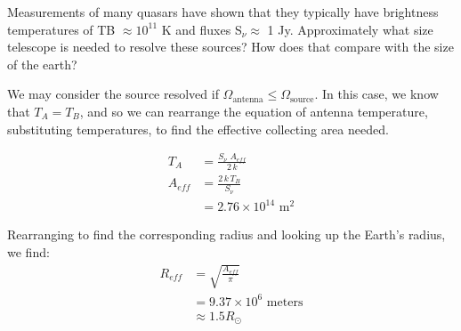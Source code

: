 \documentclass[12pt]{article}
\newenvironment{answer}[2][Answer]{\begin{trivlist}
\item[\hskip \labelsep {\bfseries #1}\hskip \labelsep {\bfseries #2.}]}{\end{trivlist}}
\newenvironment{warmup}[2][Warm Up]{\begin{trivlist}
\item[\hskip \labelsep {\bfseries #1}\hskip \labelsep {\bfseries #2.}]}{\end{trivlist}}
\begin{document}
\begin{warmup}{2}
  Measurements of many quasars have shown that they typically have brightness temperatures of TB $\approx 10^{11}$ K and fluxes S$_{\nu} \approx$ 1 Jy. Approximately what size telescope is needed to resolve these sources? How does that compare with the size of the earth?
\end{warmup}
\begin{answer}{Warm Up 2}

We may consider the source resolved if $\Omega_{\text{antenna}} \leq \Omega_{\text{source}}$. In this case, we know that $T_A = T_B$, and so we can rearrange the equation of antenna temperature, substituting temperatures, to find the effective collecting area needed.

\begin{align*}
  T_A &= \frac{S_{\nu} \,\, A_{eff}}{2 \, k} \\
  A_{eff} &= \frac{2 \, k \, T_B}{S_{\nu}} \\
          &= 2.76 \times 10^{14} \text{  m$^2$}
\end{align*}

Rearranging to find the corresponding radius and looking up the Earth's radius, we find:
\begin{align*}
  R_{eff} &= \sqrt{\frac{A_{eff}}{\pi}} \\
          &= 9.37 \times 10^6 \text{ meters} \\
          &\approx 1.5 R_{\odot}
\end{align*}
\end{answer}



\bigskip
\bigskip
\end{document}
